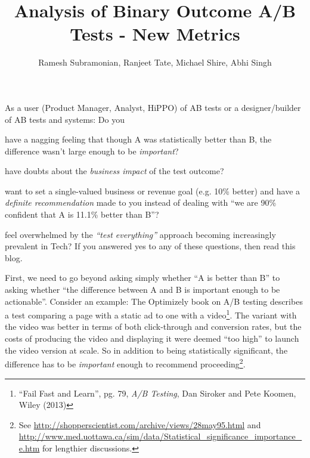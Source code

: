 \documentclass[letterpaper,12pt]{article}
\begin{document}
\title{Analysis of Binary Outcome A/B Tests - New Metrics}
\author{Ramesh Subramonian, Ranjeet Tate, Michael Shire, Abhi Singh}
\maketitle
\thispagestyle{fancy}
\lhead{}
\chead{}
\rhead{}
\lfoot{}

As a user (Product Manager, Analyst, HiPPO) of AB tests or a
designer/builder of AB tests and systems: Do you
\bi
\item have a nagging
feeling that though A was statistically better than B, the
difference wasn't large enough to be {\em important}?
\item have
  doubts about the {\em business impact} of the test outcome?
  \item want to
set a single-valued business or revenue goal (e.g. 10\% better) and have a {\em definite recommendation}
made to you instead of dealing with ``we are 90\% confident that A is
11.1\% better than B''?
\item feel overwhelmed by the {\em ``test
  everything''} approach becoming increasingly prevalent in Tech?
  \ei
  If you
answered yes to any of these questions, then read this blog.

First, we need to go beyond asking simply whether ``A is better than
B'' to asking whether ``the difference between A and B
is important enough to be actionable''. Consider an example: The Optimizely
book on A/B testing describes a test comparing a page
with a static ad to one with a video\footnote{``Fail Fast and Learn'',
  pg. 79, {\em A/B Testing}, Dan Siroker and Pete Koomen, Wiley
  (2013)}. The variant with the video was better in terms of both
click-through and conversion rates, but the costs of producing the
video and displaying it were deemed ``too high'' to launch the video
version at scale. So in addition to being statistically significant,
the difference has to be {\em important} enough to recommend
proceeding\footnote{See
  \url{http://shopperscientist.com/archive/views/28may95.html} and
  \url{http://www.med.uottawa.ca/sim/data/Statistical_significance_importance_e.htm}
  for lengthier discussions.}.
\end{document}
